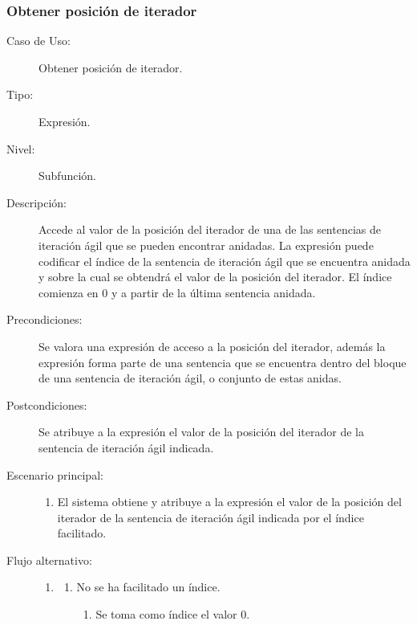 \subsubsection {Obtener posición de iterador}
\begin{framed}
\FloatBarrier
\begin{description}
   \item[Caso de Uso:]  Obtener posición de iterador.
   \item [Tipo:] Expresión.
   \item[Nivel:]  Subfunción.
   \item[Descripción:] 
   Accede al valor de la posición del iterador de una de las sentencias de iteración ágil que se pueden encontrar anidadas.  
   La expresión puede codificar el índice de la sentencia de iteración ágil que se encuentra anidada y sobre la
   cual se obtendrá el valor de la posición del iterador. El índice comienza en 0 y a partir de la última sentencia anidada.
   \item[Precondiciones:] 
   Se valora una expresión de acceso a la posición del iterador, además la expresión forma parte 
   de una sentencia que se encuentra dentro del bloque de una sentencia de iteración ágil, o conjunto 
   de estas anidas.
   \item[Postcondiciones:] 
   Se atribuye a la expresión el valor de la posición del iterador de la sentencia de iteración ágil 
   indicada.   
   \item[Escenario principal:] \hfill
   \begin{enumerate}
   \item El sistema obtiene y atribuye a la expresión el valor de la posición del iterador 
   de la sentencia de iteración ágil indicada por el índice facilitado.
   \end{enumerate}
   \item[Flujo alternativo:] \hfill 
   \begin{enumerate} \itemsep1pt \parskip0pt 
   \setcounter{enumi}{0}
   \renewcommand{\labelenumi}{}
   \renewcommand{\labelenumiii}{\arabic{enumiii}.}
   \renewcommand{\labelenumii}{\arabic{enumi}\alph{enumii}.}
      \item 
      \begin {enumerate}
         \setcounter{enumii}{0}
         \item No se ha facilitado un índice.
         \begin{enumerate}
         \item Se toma como índice el valor 0. 

\end{enumerate}
\end{enumerate}
\end{enumerate}
\end{description}
\end{framed}

